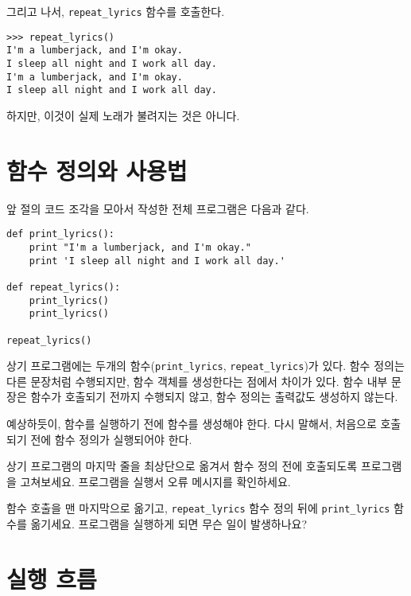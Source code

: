 그리고 나서, \verb"repeat_lyrics" 함수를 호출한다.

\beforeverb
\begin{verbatim}
>>> repeat_lyrics()
I'm a lumberjack, and I'm okay.
I sleep all night and I work all day.
I'm a lumberjack, and I'm okay.
I sleep all night and I work all day.
\end{verbatim}
\afterverb
%

하지만, 이것이 실제 노래가 불려지는 것은 아니다.

\section{함수 정의와 사용법}

앞 절의 코드 조각을 모아서 작성한 전체 프로그램은 다음과 같다.

\beforeverb
\begin{verbatim}
def print_lyrics():
    print "I'm a lumberjack, and I'm okay."
    print 'I sleep all night and I work all day.'

def repeat_lyrics():
    print_lyrics()
    print_lyrics()

repeat_lyrics()
\end{verbatim}
\afterverb
%

상기 프로그램에는 두개의 함수(\verb"print_lyrics", \verb"repeat_lyrics")가 있다.
함수 정의는 다른 문장처럼 수행되지만, 함수 객체를 생성한다는 점에서 차이가 있다.
함수 내부 문장은 함수가 호출되기 전까지 수행되지 않고, 함수 정의는 출력값도 생성하지 않는다.


예상하듯이, 함수를 실행하기 전에 함수를 생성해야 한다. 
다시 말해서, 처음으로 호출되기 전에 함수 정의가 실행되어야 한다.

\begin{ex}
상기 프로그램의 마지막 줄을 최상단으로 옮겨서 함수 정의 전에 호출되도록 프로그램을 고쳐보세요.
프로그램을 실행서 오류 메시지를 확인하세요.
\end{ex}

\begin{ex}
함수 호출을 맨 마지막으로 옮기고, \verb"repeat_lyrics" 함수 정의 뒤에 \verb"print_lyrics" 함수를 옮기세요.
프로그램을 실행하게 되면 무슨 일이 발생하나요?
\end{ex}


\section{실행 흐름}

